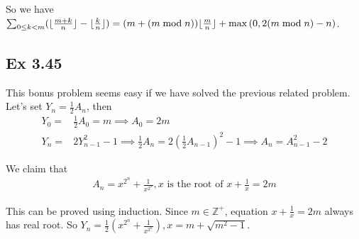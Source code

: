 \documentclass{article}
\begin{document}
So we have$\sum_{0\le k < m}(\lfloor \frac{m+k}{n} \rfloor - \lfloor \frac{k}{n} \rfloor) = (m + (m \bmod n))\lfloor \frac{m}{n} \rfloor + \max{(0, 2(m \bmod n)-n)}$.

\subsection{Ex 3.45}
This bonus problem seems easy if we have solved the previous related problem. Let's set $Y_n=\frac{1}{2}A_n$, then
\begin{equation}
    \begin{split}
        Y_0 = & \frac{1}{2}A_0 = m \implies A_0 = 2m\\
        Y_n = & 2Y_{n-1}^2 - 1 \implies \frac{1}{2}A_n = 2(\frac{1}{2}A_{n-1})^2 - 1 \implies A_n = A_{n-1}^2 - 2
    \end{split}
\end{equation}

We claim that
\begin{equation}
    \begin{split}
        A_n = x^{2^n} + \frac{1}{x^{2^n}}, x \text{ is the root of } x + \frac{1}{x} = 2m
    \end{split}
\end{equation}

This can be proved using induction. Since $m\in \mathbb{Z}^+$, equation $x+\frac{1}{x}=2m$ always has real root. So $Y_n=\frac{1}{2}(x^{2^n} + \frac{1}{x^{2^n}}), x = m+\sqrt{m^2-1}$.
\end{document}
